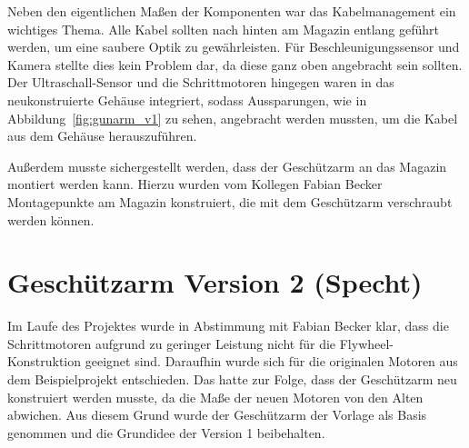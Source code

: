 Neben den eigentlichen Maßen der Komponenten war das Kabelmanagement ein wichtiges Thema. Alle Kabel sollten nach hinten am Magazin entlang geführt werden, um eine saubere Optik zu gewährleisten. Für Beschleunigungssensor und Kamera stellte dies kein Problem dar, da diese ganz oben angebracht sein sollten. Der Ultraschall-Sensor und die Schrittmotoren hingegen waren in das neukonstruierte Gehäuse integriert, sodass Aussparungen, wie in Abbildung~\ref{fig:gunarm_v1} zu sehen, angebracht werden mussten, um die Kabel aus dem Gehäuse herauszuführen.

Außerdem musste sichergestellt werden, dass der Geschützarm an das Magazin montiert werden kann. Hierzu wurden vom Kollegen Fabian Becker Montagepunkte am Magazin konstruiert, die mit dem Geschützarm verschraubt werden können.

\section{Geschützarm Version 2 (Specht)}

Im Laufe des Projektes wurde in Abstimmung mit Fabian Becker klar, dass die Schrittmotoren aufgrund zu geringer Leistung nicht für die Flywheel-Konstruktion geeignet sind. Daraufhin wurde sich für die originalen Motoren aus dem Beispielprojekt entschieden. Das hatte zur Folge, dass der Geschützarm neu konstruiert werden musste, da die Maße der neuen Motoren von den Alten abwichen. Aus diesem Grund wurde der Geschützarm der Vorlage als Basis genommen und die Grundidee der Version 1 beibehalten.

